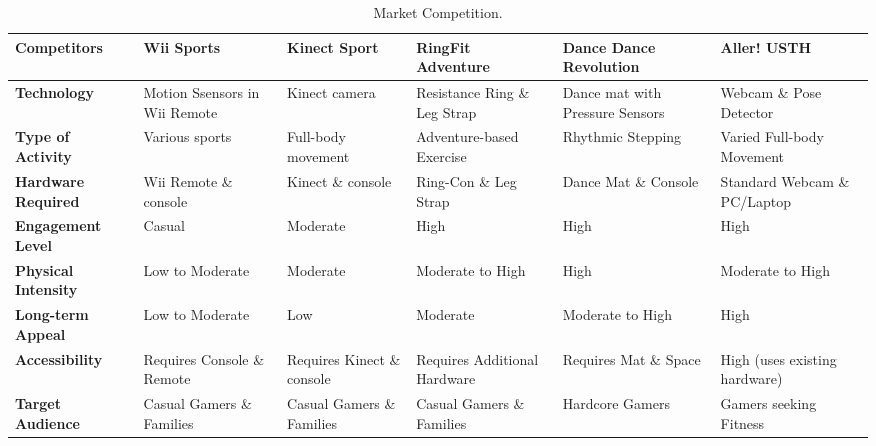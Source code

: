 \documentclass[12pt]{article}
\begin{document}

\begin{table}[H]
    \centering
    \caption{Market Competition.}
    \begin{tabularx}{\textwidth}{|>{}Y|Y|Y|Y|Y|Y|}
        \hline
        \textbf{Competitors}        & \textbf{Wii Sports}           & \textbf{Kinect Sport } & \textbf{RingFit Adventure}   & \textbf{Dance Dance Revolution} & \textbf{Aller! USTH}           \\
        \hline
        \textbf{Technology}         & Motion Ssensors in Wii Remote & Kinect camera                & Resistance Ring \& Leg Strap & Dance mat with Pressure Sensors & Webcam \& Pose Detector        \\
        \hline
        \textbf{Type of Activity}   & Various sports                & Full-body movement           & Adventure-based Exercise     & Rhythmic Stepping               & Varied Full-body Movement      \\
        \hline
        \textbf{Hardware Required}  & Wii Remote \& console         & Kinect \& console            & Ring-Con \& Leg Strap        & Dance Mat \& Console            & Standard Webcam \&  PC/Laptop  \\
        \hline
        \textbf{Engagement Level}   & Casual                        & Moderate                     & High                         & High                            & High                           \\
        \hline
        \textbf{Physical Intensity} & Low to Moderate               & Moderate                     & Moderate to High             & High                            & Moderate to High               \\
        \hline
        \textbf{Long-term Appeal}   & Low to Moderate               & Low                          & Moderate                     & Moderate to High                & High                           \\
        \hline
        \textbf{Accessibility}      & Requires Console \& Remote    & Requires Kinect \& console   & Requires Additional Hardware & Requires Mat \& Space           & High (uses existing  hardware) \\
        \hline
        \textbf{Target Audience}    & Casual Gamers \&  Families    & Casual Gamers \&  Families   & Casual Gamers \&  Families   & Hardcore Gamers                 & Gamers seeking Fitness         \\
        \hline
    \end{tabularx}
\end{table}
\end{document}
